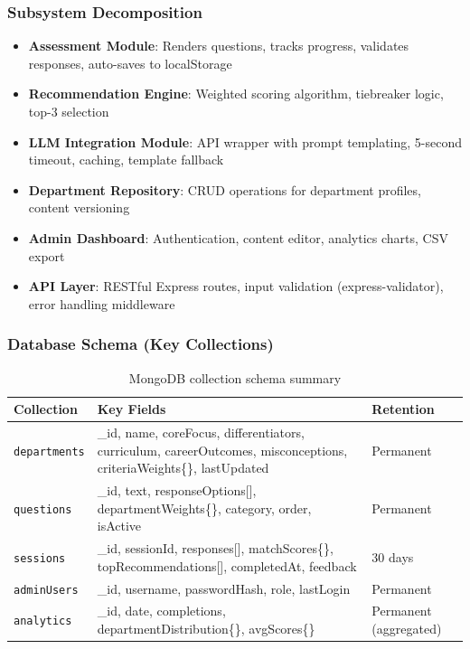﻿\documentclass[12pt, a4paper]{article}
\newcommand{\theadrow}{\rowcolor{tableheader}}
\newcommand{\rowalt}{\rowcolor{tablerowalt}}
\begin{document}
\subsubsection*{Subsystem Decomposition}

\begin{itemize}[leftmargin=1.5em, itemsep=3pt]
    \item \textbf{Assessment Module}: Renders questions, tracks progress, validates responses, auto-saves to localStorage
    \item \textbf{Recommendation Engine}: Weighted scoring algorithm, tiebreaker logic, top-3 selection
    \item \textbf{LLM Integration Module}: API wrapper with prompt templating, 5-second timeout, caching, template fallback
    \item \textbf{Department Repository}: CRUD operations for department profiles, content versioning
    \item \textbf{Admin Dashboard}: Authentication, content editor, analytics charts, CSV export
    \item \textbf{API Layer}: RESTful Express routes, input validation (express-validator), error handling middleware
\end{itemize}

\subsubsection*{Database Schema (Key Collections)}

\begin{table}[H]
\centering
\begin{tabularx}{\textwidth}{p{3cm}Xp{2.5cm}}
\toprule
\theadrow
\textbf{Collection} & \textbf{Key Fields} & \textbf{Retention} \\
\midrule
\texttt{departments}  & \_id, name, coreFocus, differentiators, curriculum, careerOutcomes, misconceptions, criteriaWeights\{\}, lastUpdated & Permanent \\[4pt]
\rowalt
\texttt{questions}    & \_id, text, responseOptions[], departmentWeights\{\}, category, order, isActive & Permanent \\[4pt]
\texttt{sessions}     & \_id, sessionId, responses[], matchScores\{\}, topRecommendations[], completedAt, feedback & 30 days \\[4pt]
\rowalt
\texttt{adminUsers}   & \_id, username, passwordHash, role, lastLogin & Permanent \\[4pt]
\texttt{analytics}    & \_id, date, completions, departmentDistribution\{\}, avgScores\{\} & Permanent (aggregated) \\
\bottomrule
\end{tabularx}
\caption{MongoDB collection schema summary}
\end{table}
\end{document}
